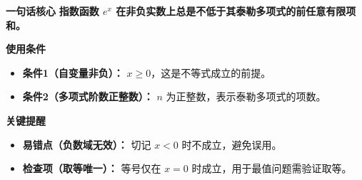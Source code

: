 \begin{summarybox}
\textbf{\textcolor{CSummary}{一句话核心}}
\textbf{指数函数 $e^x$ 在非负实数上总是不低于其泰勒多项式的前任意有限项和。}

\medskip
\textbf{\textcolor{CSummary}{使用条件}}
\begin{itemize}[leftmargin=*, itemsep=0.5em, topsep=0.4em]
    \item \textbf{条件1（自变量非负）：} $x \geq 0$，这是不等式成立的前提。
    \item \textbf{条件2（多项式阶数正整数）：} $n$ 为正整数，表示泰勒多项式的项数。
\end{itemize}

\medskip
\textbf{\textcolor{CSummary}{关键提醒}}
\begin{itemize}[leftmargin=*, itemsep=0.5em, topsep=0.4em]
    \item \textbf{易错点（负数域无效）：} 切记 $x < 0$ 时不成立，避免误用。
    \item \textbf{检查项（取等唯一）：} 等号仅在 $x=0$ 时成立，用于最值问题需验证取等。
\end{itemize}
\end{summarybox}
